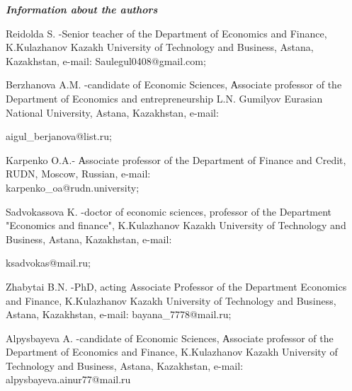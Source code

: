 \emph{{\bfseries Information about the authors}}

\begin{noparindent}
Reidolda S. -Senior teacher of the Department of Economics and Finance,
K.Kulazhanov Kazakh University of Technology and Business, Astana,
Kazakhstan, e-mail: Saulegul0408@gmail.com;

Berzhanova A.M. -candidate of Economic Sciences, Аssociate professor of
the Department of Economics and entrepreneurship L.N. Gumilyov Eurasian
National University, Astana, Kazakhstan, e-mail:

aigul\_berjanova@list.ru;

Karpenko O.A.- Аssociate professor of the
Department of Finance and Credit, RUDN, Moscow, Russian, e-mail:\\
karpenko\_oa@rudn.university;

Sadvokassova K. -doctor of economic sciences, professor of the
Department "Economics and finance", K.Kulazhanov Kazakh University of
Technology and Business, Astana, Kazakhstan, e-mail:

ksadvokas@mail.ru;

Zhabytai B.N. -PhD, acting Associate Professor of the Department
Economics and Finance, K.Kulazhanov Kazakh University of Technology and
Business, Astana, Kazakhstan, e-mail: bayana\_7778@mail.ru;

Alpysbayeva A. -candidate of Economic Sciences, Аssociate professor of
the Department of Economics and Finance, K.Kulazhanov Kazakh University
of Technology and Business, Astana, Kazakhstan, e-mail:
alpysbayeva.ainur77@mail.ru
\end{noparindent}
